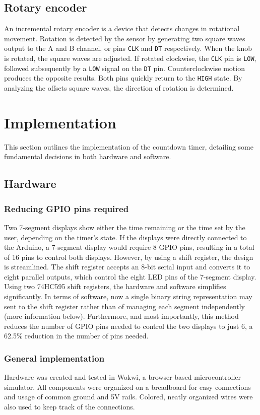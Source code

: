 \documentclass[fleqn]{article}
\begin{document}
\subsection*{Rotary encoder}
An incremental rotary encoder is a device that detects changes in rotational movement. Rotation is detected by the sensor by generating two square waves output to the A and B channel, or pins \verb|CLK| and \verb|DT| respectively. When the knob is rotated, the square waves are adjusted. If rotated clockwise, the \verb|CLK| pin is \verb|LOW|, followed subsequently by a \verb|LOW| signal on the \verb|DT| pin. Counterclockwise motion produces the opposite results. Both pins quickly return to the \verb|HIGH| state. By analyzing the offsets square waves, the direction of rotation is determined. 


\section*{Implementation}
This section outlines the implementation of the countdown timer, detailing some fundamental decisions in both hardware and software.

\subsection*{Hardware}
\subsubsection*{Reducing GPIO pins required}
Two 7-segment displays show either the time remaining or the time set by the user, depending on the timer's state. If the displays were directly connected to the Arduino, a 7-segment display would require 8 GPIO pins, resulting in a total of 16 pins to control both displays. However, by using a shift register, the design is streamlined. The shift register accepts an 8-bit serial input and converts it to eight parallel outputs, which control the eight LED pins of the 7-segment display. Using two 74HC595 shift registers, the hardware and software simplifies significantly. In terms of software, now a single binary string representation may sent to the shift register rather than of managing each segment independently (more information below). Furthermore, and most importantly, this method reduces the number of GPIO pins needed to control the two displays to just 6, a 62.5\% reduction in the number of pins needed.

\subsubsection*{General implementation}
Hardware was created and tested in Wokwi, a browser-based microcontroller simulator. All components were organized on a breadboard for easy connections and usage of common ground and 5V rails. Colored, neatly organized wires were also used to keep track of the connections.
\end{document}
